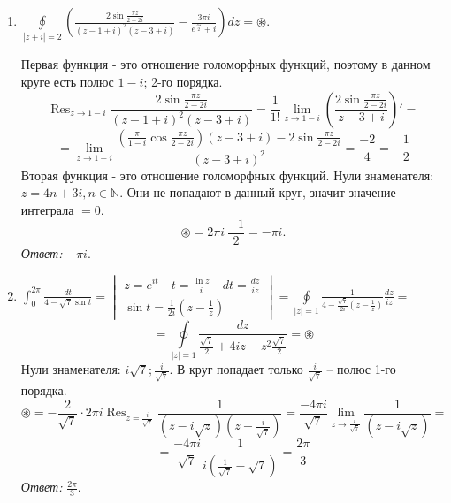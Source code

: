 \documentclass[14pt, a4paper, titlepage, fleqn]{extarticle}
\DeclareMathOperator*{\res}{Res}
\begin{document}
\begin{enumerate}
            \item \( \oint\limits_{\left| z + i \right|=2} \left( \frac{2 \sin \frac{\pi z}{2 - 2i}}{(z-1+i)^2 (z-3+i)} - \frac{3\pi i}{e^\frac{\pi z}{2} + i} \right) dz = \circledast. \)
            
            Первая функция - это отношение голоморфных функций, поэтому в данном круге есть полюс \( 1 - i \); 2-го порядка.
            \[
                \res_{z\to 1-i} \frac{2 \sin \frac{\pi z}{2 - 2i}}{(z-1+i)^2 (z-3+i)} = \frac{1}{1!} \lim_{z\to 1-i} \left( \frac{2 \sin \frac{\pi z}{2 - 2i}}{z-3+i} \right)' =
            \]
            \[
                = \lim_{z\to 1-i} \frac{ \left( \frac{\pi}{1-i}\cos \frac{\pi z}{2-2i} \right)(z-3+i) - 2 \sin \frac{\pi z}{2 - 2i} }{(z-3+i)^2} = \frac{-2}{4} = -\frac{1}{2}
            \]
            Вторая функция - это отношение голоморфных функций. Нули знаменателя: \( z = 4n + 3i, n \in \mathbb{N} \). Они не попадают в данный круг, значит значение интеграла \( = 0 \).
            \[
                \circledast = 2 \pi i ~ \frac{-1}{2} = -\pi i.
            \]
            \textit{Ответ:} \( -\pi i \).

            \item \( 
                \int_0^{2\pi} \frac{dt}{4 - \sqrt{7} \sin t} = \begin{vmatrix}
                z = e^{it} \quad t = \frac{\ln z}{i} \quad dt = \frac{dz}{iz} \\
                \sin t = \frac{1}{2i} \left( z - \frac{1}{z} \right)
            \end{vmatrix} = \oint\limits_{|z|=1} \frac{1}{4 - \frac{\sqrt{7}}{2i}\left( z - \frac{1}{z} \right)} \frac{dz}{iz} =
            \)
            \[
                = \oint\limits_{|z|=1} \frac{dz}{\frac{\sqrt{7}}{2} + 4iz - z^2\frac{\sqrt{7}}{2}} = \circledast
            \]
            Нули знаменателя: \( i\sqrt{7}; \frac{i}{\sqrt{7}} \). В круг попадает только \( \frac{i}{\sqrt{7}} \) -- полюс 1-го порядка.
            \[
                \circledast = -\frac{2}{\sqrt{7}} \cdot 2\pi i \res_{z=\frac{i}{\sqrt{7}}}\frac{1}{(z-i\sqrt{z})(z - \frac{i}{\sqrt{7}})} = \frac{-4\pi i}{\sqrt{7}} \lim_{z \to \frac{i}{\sqrt{7}}} \frac{1}{(z-i\sqrt{z})} =
            \]
            \[
                = \frac{-4\pi i}{\sqrt{7}} \frac{1}{i \left( \frac{1}{\sqrt{7}} - \sqrt{7} \right)} = \frac{2\pi}{3}
            \]
            \textit{Ответ:} \( \frac{2\pi}{3} \).


\end{enumerate}
\end{document}
